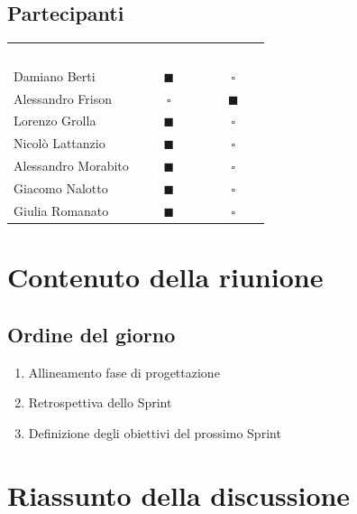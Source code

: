 \documentclass[a4paper, 11pt]{article}
\begin{document}
\subsection{Partecipanti}
\begin{center}
    \begin{tabular}{>{\raggedright\arraybackslash}p{6cm} c c}
        \rowcolor{AccentColor}
        \textcolor{white}{\textbf{Nome e Cognome}} & 
        \textcolor{white}{\textbf{Presente}} & 
        \textcolor{white}{\textbf{Assente}} \\
        
        Damiano Berti     & \textcolor{AccentColor}{$\blacksquare$}    & $\square$        \\
        Alessandro Frison   & $\square$  & \textcolor{AccentColor}{$\blacksquare$}            \\
        Lorenzo Grolla     & \textcolor{AccentColor}{$\blacksquare$}    & $\square$        \\
        Nicolò Lattanzio    & \textcolor{AccentColor}{$\blacksquare$}    & $\square$        \\
        Alessandro Morabito   & \textcolor{AccentColor}{$\blacksquare$}    & $\square$        \\
        Giacomo Nalotto   & \textcolor{AccentColor}{$\blacksquare$}    & $\square$        \\
        Giulia Romanato   & \textcolor{AccentColor}{$\blacksquare$}    & $\square$        \\
    \end{tabular}
\end{center}

\section{Contenuto della riunione}
\subsection{Ordine del giorno}
\begin{enumerate}
    \item Allineamento fase di progettazione
    \item Retrospettiva dello Sprint
    \item Definizione degli obiettivi del prossimo Sprint
\end{enumerate}
\newpage
\section{Riassunto della discussione}
\end{document}
